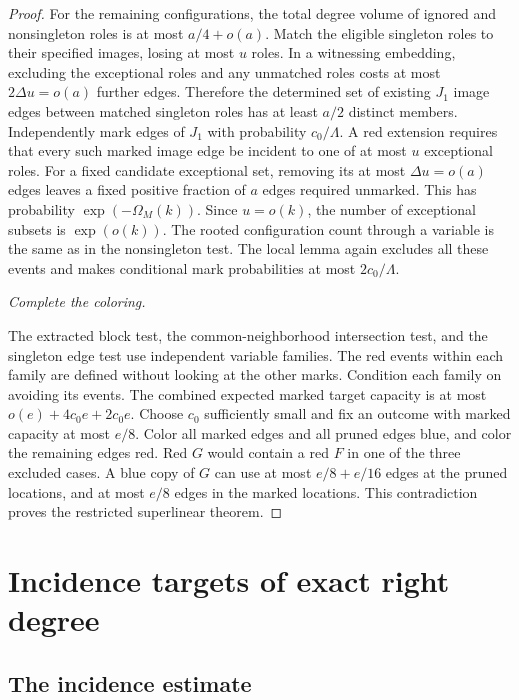 \documentclass[11pt]{amsart}
\theoremstyle{definition}
\theoremstyle{remark}
\numberwithin{equation}{section}
\begin{document}
\begin{proof}
For the remaining configurations, the total degree volume of ignored and nonsingleton roles is at most $a/4+o(a)$. Match the eligible singleton roles to their specified images, losing at most $ u $ roles. In a witnessing embedding, excluding the exceptional roles and any unmatched roles costs at most $2\Delta u=o(a)$ further edges. Therefore the determined set of existing $ J_1$ image edges between matched singleton roles has at least $ a/2$ distinct members. Independently mark edges of $ J_1$ with probability $ c_0/\Lambda $. A red extension requires that every such marked image edge be incident to one of at most $ u $ exceptional roles. For a fixed candidate exceptional set, removing its at most $\Delta u=o(a)$ edges leaves a fixed positive fraction of $ a $ edges required unmarked. This has probability $\exp(-\Omega_M(k))$. Since $ u=o(k)$, the number of exceptional subsets is $\exp(o(k))$. The rooted configuration count through a variable is the same as in the nonsingleton test. The local lemma again excludes all these events and makes conditional mark probabilities at most $2c_0/\Lambda$.

\medskip\noindent\emph{Complete the coloring.}

The extracted block test, the common-neighborhood intersection test, and the singleton edge test use independent variable families. The red events within each family are defined without looking at the other marks. Condition each family on avoiding its events. The combined expected marked target capacity is at most $o(e)+4c_0e+2c_0e $. Choose $ c_0$ sufficiently small and fix an outcome with marked capacity at most $ e/8$. Color all marked edges and all pruned edges blue, and color the remaining edges red. Red $ G $ would contain a red $ F $ in one of the three excluded cases. A blue copy of $ G $ can use at most $ e/8+e/16$ edges at the pruned locations, and at most $ e/8$ edges in the marked locations. This contradiction proves the restricted superlinear theorem.

\end{proof}

\section{Incidence targets of exact right degree}\label{sec:incidence}

\subsection{The incidence estimate}
\end{document}
